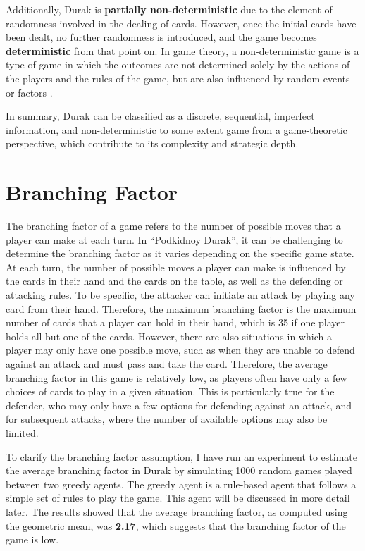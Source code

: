 Additionally, Durak is \textbf{partially non-deterministic} due to the element of randomness involved in the dealing of cards. However, once the initial cards have been dealt, no further randomness is introduced, and the game becomes \textbf{deterministic} from that point on. In game theory, a non-deterministic game is a type of game in which the outcomes are not determined solely by the actions of the players and the rules of the game, but are also influenced by random events or factors \citep{Gametheory4}. 

In summary, Durak can be classified as a discrete, sequential, imperfect information, and non-deterministic to some extent game from a game-theoretic perspective, which contribute to its complexity and strategic depth.


\section{Branching Factor}

The branching factor of a game refers to the number of possible moves that a player can make at each turn. In ``Podkidnoy Durak'', it can be challenging to determine the branching factor as it varies depending on the specific game state. At each turn, the number of possible moves a player can make is influenced by the cards in their hand and the cards on the table, as well as the defending or attacking rules. To be specific, the attacker can initiate an attack by playing any card from their hand. Therefore, the maximum branching factor is the maximum number of cards that a player can hold in their hand, which is 35 if one player holds all but one of the cards. However, there are also situations in which a player may only have one possible move, such as when they are unable to defend against an attack and must pass and take the card. Therefore, the average branching factor in this game is relatively low, as players often have only a few choices of cards to play in a given situation. This is particularly true for the defender, who may only have a few options for defending against an attack, and for subsequent attacks, where the number of available options may also be limited.

To clarify the branching factor assumption, I have run an experiment to estimate the average branching factor in Durak by simulating 1000 random games played between two greedy agents. The greedy agent is a rule-based agent that follows a simple set of rules to play the game. This agent will be discussed in more detail later. The results showed that the average branching factor, as computed using the geometric mean, was \textbf{2.17}, which suggests that the branching factor of the game is low. 

